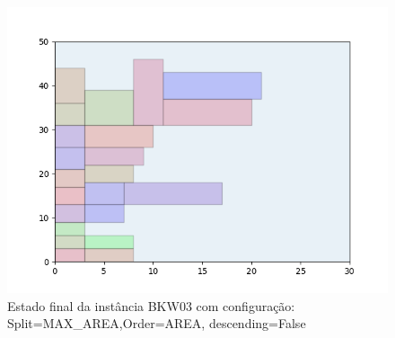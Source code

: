 \begin{figure}[H]
    \centering
    \caption[]{Estado final da instância BKW03 com configuração: Split=MAX_AREA,Order=AREA, descending=False}
    \label{fig:bkw03-max_area-area-false}
    \includegraphics[scale=0.5]{output/figures/bkw/bkw03/max_area/area/false/00}
\end{figure}